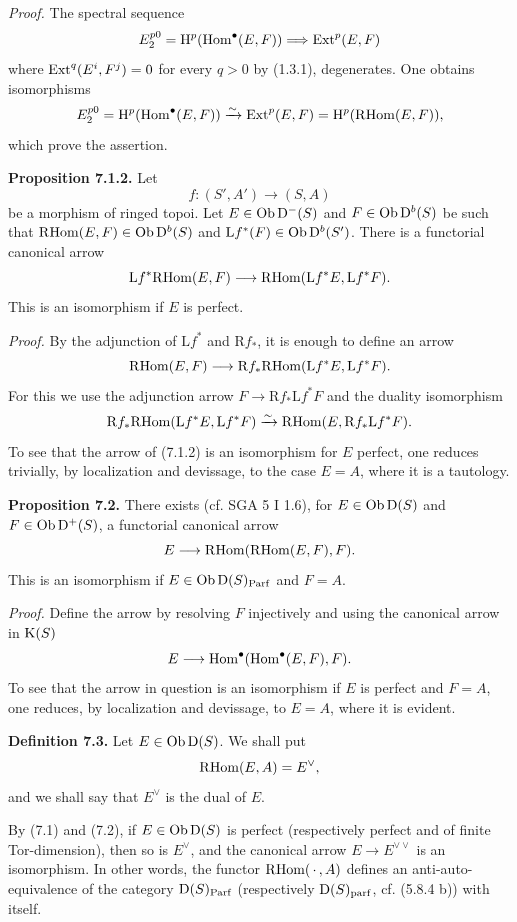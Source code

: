 \documentclass[11pt]{article}
\newcommand{\Parf}{\operatorname{Parf}}
\begin{document}
\emph{Proof.} The spectral sequence
\[
  E_2^{p0}=\mathrm H^p(\operatorname{Hom}^\bullet(E,F))
  \Longrightarrow \operatorname{Ext}^p(E,F)
\]
where \(\operatorname{Ext}^q(E^i,F^j)=0\) for every \(q>0\) by (1.3.1), degenerates. One obtains isomorphisms
\[
  E_2^{p0}=\mathrm H^p(\operatorname{Hom}^\bullet(E,F))
  \xrightarrow{\sim}\operatorname{Ext}^p(E,F)=\mathrm H^p(\mathrm R\!\operatorname{Hom}(E,F)),
\]
which prove the assertion.

\textbf{Proposition 7.1.2.} Let
\[
  f:(S',A')\longrightarrow(S,A)
\]
be a morphism of ringed topoi. Let \(E\in\operatorname{Ob}\mathrm D^-(S)\) and \(F\in\operatorname{Ob}\mathrm D^b(S)\) be such that \(\mathrm R\!\operatorname{Hom}(E,F)\in\operatorname{Ob}\mathrm D^b(S)\) and \(\mathrm Lf^*(F)\in\operatorname{Ob}\mathrm D^b(S')\). There is a functorial canonical arrow
\[
  \mathrm Lf^*\mathrm R\!\operatorname{Hom}(E,F)
  \longrightarrow
  \mathrm R\!\operatorname{Hom}(\mathrm Lf^*E,\mathrm Lf^*F).
\]
This is an isomorphism if \(E\) is perfect.

\emph{Proof.} By the adjunction of \(\mathrm Lf^*\) and \(\mathrm Rf_*\), it is enough to define an arrow
\[
  \mathrm R\!\operatorname{Hom}(E,F)
  \longrightarrow
  \mathrm Rf_*\mathrm R\!\operatorname{Hom}(\mathrm Lf^*E,\mathrm Lf^*F).
\]
For this we use the adjunction arrow \(F\to\mathrm Rf_*\mathrm Lf^*F\) and the duality isomorphism
\[
  \mathrm Rf_*\mathrm R\!\operatorname{Hom}(\mathrm Lf^*E,\mathrm Lf^*F)
  \xrightarrow{\sim}
  \mathrm R\!\operatorname{Hom}(E,\mathrm Rf_*\mathrm Lf^*F).
\]
To see that the arrow of (7.1.2) is an isomorphism for \(E\) perfect, one reduces trivially, by localization and devissage, to the case \(E=A\), where it is a tautology.

\textbf{Proposition 7.2.} There exists (cf. SGA 5 I 1.6), for \(E\in\operatorname{Ob}\mathrm D(S)\) and \(F\in\operatorname{Ob}\mathrm D^+(S)\), a functorial canonical arrow
\[
  E\longrightarrow\mathrm R\!\operatorname{Hom}(\mathrm R\!\operatorname{Hom}(E,F),F).
\]
This is an isomorphism if \(E\in\Ob\Dpx(S)_{\Parf}\) and \(F=A\).

\emph{Proof.} Define the arrow by resolving \(F\) injectively and using the canonical arrow in \(\mathrm K(S)\)
\[
  E\longrightarrow \operatorname{Hom}^\bullet(\operatorname{Hom}^\bullet(E,F),F).
\]
To see that the arrow in question is an isomorphism if \(E\) is perfect and \(F=A\), one reduces, by localization and devissage, to \(E=A\), where it is evident.

\textbf{Definition 7.3.} Let \(E\in\operatorname{Ob}\mathrm D(S)\). We shall put
\[
  \mathrm R\!\operatorname{Hom}(E,A)=E^\vee,
\]
and we shall say that \(E^\vee\) is the dual of \(E\).

By (7.1) and (7.2), if \(E\in\operatorname{Ob}\mathrm D(S)\) is perfect (respectively perfect and of finite Tor-dimension), then so is \(E^\vee\), and the canonical arrow \(E\to E^{\vee\vee}\) is an isomorphism. In other words, the functor \(\mathrm R\!\operatorname{Hom}(\,\cdot\,,A)\) defines an anti-auto-equivalence of the category \(\Dpx(S)_{\Parf}\) (respectively \(\mathrm D(S)_{\mathrm{parf}}\), cf. (5.8.4 b)) with itself.
\end{document}
